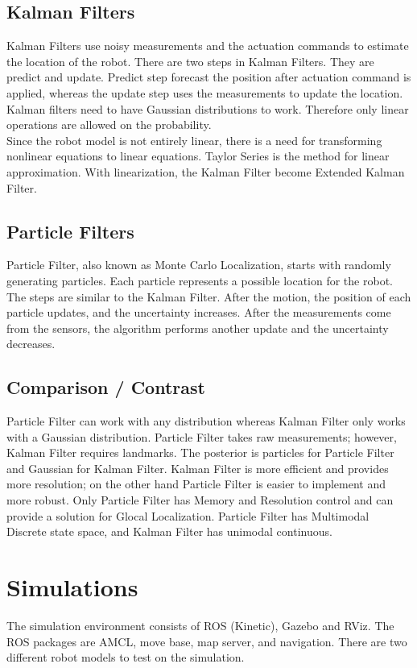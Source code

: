 \documentclass[10pt,journal,compsoc]{IEEEtran}
\begin{document}
\subsection{Kalman Filters}
Kalman Filters use noisy measurements and the actuation commands to estimate the location of the robot. There are two steps in Kalman Filters. They are predict and update. Predict step forecast the position after actuation command is applied, whereas the update step uses the measurements to update the location.
Kalman filters need to have Gaussian distributions to work. Therefore only linear operations are allowed on the probability. \\
Since the robot model is not entirely linear, there is a need for transforming nonlinear equations to linear equations. Taylor Series is the method for linear approximation. With linearization, the Kalman Filter become Extended Kalman Filter. \cite{wiki:kf}

\subsection{Particle Filters}
Particle Filter, also known as Monte Carlo Localization, starts with randomly generating particles. Each particle represents a possible location for the robot. The steps are similar to the Kalman Filter. After the motion, the position of each particle updates, and the uncertainty increases. After the measurements come from the sensors, the algorithm performs another update and the uncertainty decreases.

\subsection{Comparison / Contrast}
Particle Filter can work with any distribution whereas Kalman Filter only works with a Gaussian distribution. Particle Filter takes raw measurements; however, Kalman Filter requires landmarks. The posterior is particles for Particle Filter and Gaussian for Kalman Filter. Kalman Filter is more efficient and provides more resolution; on the other hand Particle Filter is easier to implement and more robust. Only Particle Filter has Memory and Resolution control and can provide a solution for Glocal Localization. Particle Filter has Multimodal Discrete state space, and Kalman Filter has unimodal continuous.

\section{Simulations}
The simulation environment consists of ROS (Kinetic), Gazebo and RViz. The ROS packages are AMCL, move base, map server, and navigation. There are two different robot models to test on the simulation.
\end{document}
